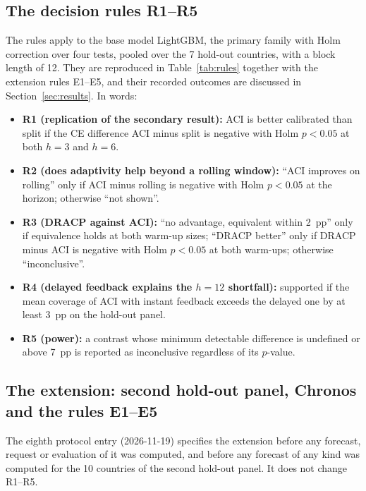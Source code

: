 \subsection{The decision rules R1--R5}\label{sec:rules}

The rules apply to the base model LightGBM, the primary family with Holm correction over four tests, pooled over the 7 hold-out countries, with a block length of 12. They are reproduced in Table~\ref{tab:rules} together with the extension rules E1--E5, and their recorded outcomes are discussed in Section~\ref{sec:results}. In words:
\begin{itemize}
\item \textbf{R1 (replication of the secondary result):} ACI is better calibrated than split if the CE difference ACI minus split is negative with Holm $p<0.05$ at both $h=3$ and $h=6$.
\item \textbf{R2 (does adaptivity help beyond a rolling window):} ``ACI improves on rolling'' only if ACI minus rolling is negative with Holm $p<0.05$ at the horizon; otherwise ``not shown''.
\item \textbf{R3 (DRACP against ACI):} ``no advantage, equivalent within 2~pp'' only if equivalence holds at both warm-up sizes; ``DRACP better'' only if DRACP minus ACI is negative with Holm $p<0.05$ at both warm-ups; otherwise ``inconclusive''.
\item \textbf{R4 (delayed feedback explains the $h=12$ shortfall):} supported if the mean coverage of ACI with instant feedback exceeds the delayed one by at least 3~pp on the hold-out panel.
\item \textbf{R5 (power):} a contrast whose minimum detectable difference is undefined or above 7~pp is reported as inconclusive regardless of its $p$-value.
\end{itemize}

\begin{table}[t]
\centering
\caption{Decision rules R1--R5 and extension rules E1--E5 as pre-specified, with their recorded outcomes.}
\label{tab:rules}
\small
\fittable{}
\end{table}

\subsection{The extension: second hold-out panel, Chronos and the rules E1--E5}\label{sec:extension}

The eighth protocol entry (2026-11-19) specifies the extension before any forecast, request or evaluation of it was computed, and before any forecast of any kind was computed for the 10 countries of the second hold-out panel. It does not change R1--R5.

